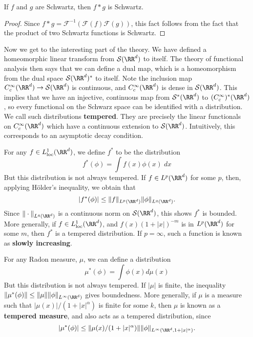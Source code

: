 \begin{corollary}
	If $f$ and $g$ are Schwartz, then $f * g$ is Schwartz.
\end{corollary}
\begin{proof}
	Since $f * g = \mathcal{F}^{-1}(\mathcal{F}(f) \mathcal{F}(g))$, this fact follows from the fact that the product of two Schwartz functions is Schwartz.
\end{proof}

Now we get to the interesting part of the theory. We have defined a homeomorphic linear transform from $\mathcal{S}(\RR^d)$ to itself. The theory of functional analysis then says that we can define a dual map, which is a homeomorphism from the dual space $\mathcal{S}(\RR^d)^*$ to itself. Note the inclusion map $C_c^\infty(\RR^d) \to \mathcal{S}(\RR^d)$ is continuous, and $C_c^\infty(\RR^d)$ is dense in $\mathcal{S}(\RR^d)$. This implies that we have an injective, continuous map from $\mathcal{S}^*(\RR^d)$ to $(C_c^\infty)^*(\RR^d)$, so every functional on the Schwarz space can be identified with a distribution. We call such distributions {\bf tempered}. They are precisely the linear functionals on $C_c^\infty(\RR^d)$ which have a continuous extension to $\mathcal{S}(\RR^d)$. Intuitively, this corresponds to an asymptotic decay condition.

\begin{example}
	For any $f \in L^1_{\text{loc}}(\RR^d)$, we define $f^*$ to be the distribution
	\[ f^*(\phi) = \int f(x) \phi(x)\; dx \]
	But this distribution is not always tempered. If $f \in L^p(\RR^d)$ for some $p$, then, applying H\"{o}lder's inequality, we obtain that
	\[ |f^*(\phi)| \leq \| f \|_{L^p(\RR^d)} \| \phi \|_{L^q(\RR^d)}. \]
	Since $\| \cdot \|_{L^q(\RR^d)}$ is a continuous norm on $\mathcal{S}(\RR^d)$, this shows $f^*$ is bounded. More generally, if $f \in L^1_{\text{loc}}(\RR^d)$, and $f(x) (1 + |x|)^{-m}$ is in $L^p(\RR^d)$ for some $m$, then $f^*$ is a tempered distribution. If $p = \infty$, such a function is known as {\bf slowly increasing}.
\end{example}

\begin{example}
	For any Radon measure, $\mu$, we can define a distribution
	\[ \mu^*(\phi) = \int \phi(x) d\mu(x) \]
	But this distribution is not always tempered. If $|\mu|$ is finite, the inequality $\| \mu^*(\phi) \| \leq \| \mu \| \| \phi \|_{L^\infty(\RR^d)}$ gives boundedness. More generally, if $\mu$ is a measure such that $|\mu(x)|/(1 + |x|^\alpha)$ is finite for some $k$, then $\mu$ is known as a {\bf tempered measure}, and also acts as a tempered distribution, since
	\[ |\mu^*(\phi)| \leq \| \mu(x)/(1 + |x|^\alpha) \| \| \phi \|_{L^\infty(\RR^d, 1 + |x|^\alpha)}. \]
\end{example}

